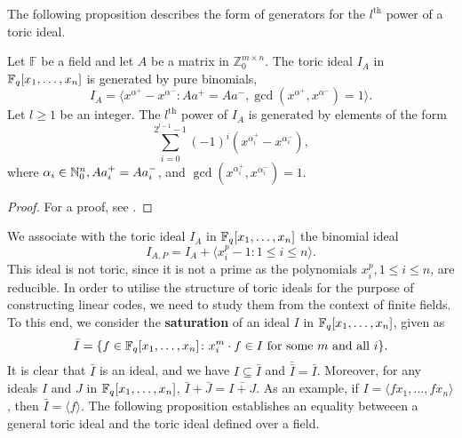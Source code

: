\documentclass[english,bachelor]{liumaiex}
\begin{document}
The following proposition describes the form of generators for the $l^\textrm{th}$ power of a toric ideal.

\begin{prop}
Let $\mathbb{F}$ be a field and let $A$ be a matrix in $\mathbb{Z}_{0}^{m\times n}$. The toric ideal $I_A$ in $\mathbb{F}_q[x_1,\dots,x_n]$ is generated by pure binomials,
\begin{displaymath}
I_A=\langle x^{\alpha^+}-x^{\alpha^-}\colon Aa^+=Aa^-, \gcd(x^{\alpha^+},x^{\alpha^-})=1\rangle.
\end{displaymath}
Let $l\geq1$ be an integer. The $l^{\textrm{th}}$ power of $I_A$ is generated by elements of the form
\begin{displaymath}
\sum_{i=0}^{2^{l-1}-1}(-1)^i(x^{\alpha_i^+}-x^{\alpha_i^-}),
\end{displaymath}
where $\alpha_i\in\mathbb{N}_{0}^n, Aa_i^+=Aa_i^-$, and $\gcd(x^{\alpha_i^+},x^{\alpha_i^-})=1$.
\end{prop}
\begin{proof}
For a proof, see \cite[pp. 52-53]{phd}.
\end{proof}
We associate with the toric ideal $I_A$ in $\mathbb{F}_q[x_1,\dots,x_n]$ the binomial ideal
\begin{displaymath}
I_{A,P}=I_A+\langle x_i^p-1\colon 1\leq i\leq n\rangle.
\end{displaymath}
This ideal is not toric, since it is not a prime as the polynomials $x_i^p, 1\leq i\leq n$, are reducible. In order to utilise the structure of toric ideals for the purpose of constructing linear codes, we need to study them from the context of finite fields. To this end, we consider the \textbf{saturation} of an ideal $I$ in $\mathbb{F}_q[x_1,\dots,x_n]$, given as
\begin{displaymath}
\bar{I}=\{f\in\mathbb{F}_q[x_1,\dots,x_n]\colon x_i^m\cdot f\in I \textrm{ for some } m \textrm{ and all }i\}.
\end{displaymath}
It is clear that $\bar{I}$ is an ideal, and we have $I\subseteq\bar{I}$ and $\bar{\bar{I}}=\bar{I}$. Moreover, for any ideals $I$ and $J$ in $\mathbb{F}_q[x_1,\dots,x_n]$, $\bar{I}+\bar{J}=\bar{I+J}$. As an example, if $I=\langle fx_1,\dots,fx_n\rangle$, then $\bar{I}=\langle f\rangle$. The following proposition establishes an equality betweeen a general toric ideal and the toric ideal defined over a field.
\end{document}
